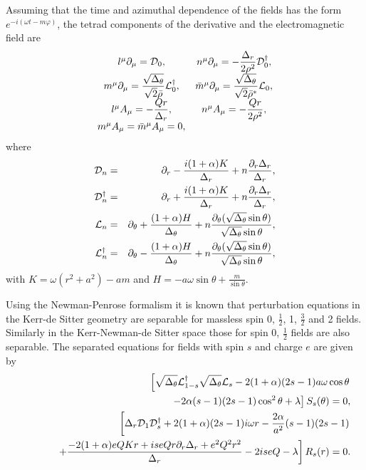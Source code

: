 %
Assuming that the time and azimuthal dependence of the fields 
has the form $e^{-i(\omega t-m\varphi)}$, the tetrad components of 
the derivative and the electromagnetic field are
%
\begin{equation}
\begin{array}{cc}
l^\mu \partial_\mu={\cal D}_0, & 
n^\mu \partial_\mu=\displaystyle{
-\frac{\Delta_r}{2\rho^2}{\cal D}_0^\dag}, \\
m^\mu \partial_\mu=\displaystyle{
\frac{\sqrt{\Delta_\theta}}{\sqrt{2}\bar{\rho}}
{\cal L}_0^\dag}, &
\bar{m}^\mu \partial_\mu=\displaystyle{
\frac{\sqrt{\Delta_\theta}}{\sqrt{2}\bar{\rho}^*}{\cal L}_0},\\
l^\mu A_\mu=\displaystyle{-\frac{Qr}{\Delta_r}}, &
n^\mu A_\mu=\displaystyle{-\frac{Qr}{2\rho^2}}, \\
m^\mu A_\mu=\bar{m}^\mu A_\mu=0, &
\end{array}
\end{equation}
%
where 
%
\begin{eqnarray}
{\cal D}_n&=&\partial_r-\frac{i(1+\alpha)K}{\Delta_r}
+n\frac{\partial_r \Delta_r}{\Delta_r}, \nonumber \\
{\cal D}_n^\dag&=&\partial_r+\frac{i(1+\alpha)K}{\Delta_r}
+n\frac{\partial_r \Delta_r}{\Delta_r},  \\
{\cal L}_n&=&\partial_\theta+\frac{(1+\alpha)H}{\Delta_\theta}
+n\frac{\partial_\theta(\sqrt{\Delta_\theta} \sin\theta)}
{\sqrt{\Delta_\theta} \sin\theta}, \nonumber \\
{\cal L}_n^\dag&=&\partial_\theta-\frac{(1+\alpha)H}{\Delta_\theta}
+n\frac{\partial_\theta(\sqrt{\Delta_\theta} \sin\theta)}
{\sqrt{\Delta_\theta} \sin\theta}, \nonumber
\end{eqnarray}
%
with $K=\omega(r^2+a^2)-am$ and
$\displaystyle{H=-a\omega\sin\theta+\frac{m}{\sin\theta}}$.

Using the Newman-Penrose formalism it is known that perturbation equations 
in the Kerr-de Sitter geometry are separable for massless 
spin 0, $\frac{1}{2}$, 1, $\frac{3}{2}$ and 2 fields.
Similarly in the Kerr-Newman-de Sitter space those for spin 0,
$\frac{1}{2}$ fields are also separable.
The separated equations for fields with spin $s$ and charge $e$ are 
given by 
%
\begin{eqnarray}
&& \left[
\sqrt{\Delta_\theta}{\cal L}_{1-s}^{\dag}\sqrt{\Delta_\theta}
{\cal L}_s
- 2(1+\alpha)(2s-1)a\omega\cos\theta \right.\nonumber \\
&&  \makebox[50mm]{} \left.
- 2\alpha(s-1)(2s-1)\cos^2\theta+\lambda \right]S_s(\theta) = 0, 
\label{eqn:Ss}\\
&& \left[
\Delta_r {\cal D}_1 {\cal D}_s^\dag +2(1+\alpha)(2s-1)i\omega r 
-\frac{2\alpha}{a^2}(s-1)(2s-1) \right.  \nonumber \\
&& \makebox[5mm]{}  \left.  
+\frac{-2(1+\alpha)eQKr+iseQr\partial_r \Delta_r+e^2Q^2r^2}
{\Delta_r}
- 2iseQ-\lambda \right]R_s(r) = 0. \label{eqn:Rs}
\end{eqnarray}
%

